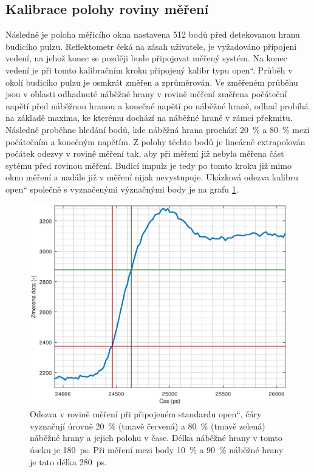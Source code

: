 \subsection{Kalibrace polohy roviny měření}
Následně je poloha měřicího okna nastavena 512 bodů před detekovanou hranu budicího pulzu. Reflektometr čeká na zásah uživatele, je vyžadováno připojení vedení, na jehož konec se později bude připojovat měřený systém. Na konec vedení je při tomto kalibračním kroku připojený kalibr typu \quotedblbase open\textquotedblleft. Průběh v okolí budicího pulzu je osmkrát změřen a zprůměrován. Ve změřeném průběhu jsou v oblasti odhadnuté náběžné hrany v rovině měření změřena počáteční napětí před náběžnou hranou a konečné napětí po náběžné hraně, odhad probíhá na základě maxima, ke kterému dochází na náběžné hraně v rámci překmitu. Následně proběhne hledání bodů, kde náběžná hrana prochází \SI{20}{\percent} a \SI{80}{\percent} mezi počátečním a konečným napětím. Z polohy těchto bodů je lineárně extrapolován počátek odezvy v rovině měření tak, aby při měření již nebyla měřena část sytému před rovinou měření. Budicí impulz je tedy po tomto kroku již mimo okno měření a nadále již v měření nijak nevystupuje. Ukázková odezva kalibru \quotedblbase open\textquotedblleft{} společně s vyznačenými význačnými body je na grafu \ref{rising_edge_DUT_open}.

\begin{figure}[H]
\includegraphics[width=\textwidth,keepaspectratio]{images/rising_edge_DUT_open.eps}\caption{Odezva v rovině měření při připojeném standardu \quotedblbase open\textquotedblleft , čáry vyznačují úrovně \SI{20}{\percent} (tmavě červená) a \SI{80}{\percent} (tmavě zelená) náběžné hrany a jejich polohu v čase. Délka náběžné hrany v tomto úseku je \SI{180}{\pico\second}. Při měření mezi body \SI{10}{\percent} a \SI{90}{\percent} náběžné hrany je tato délka \SI{280}{\pico\second}.}\label{rising_edge_DUT_open}
\end{figure}

